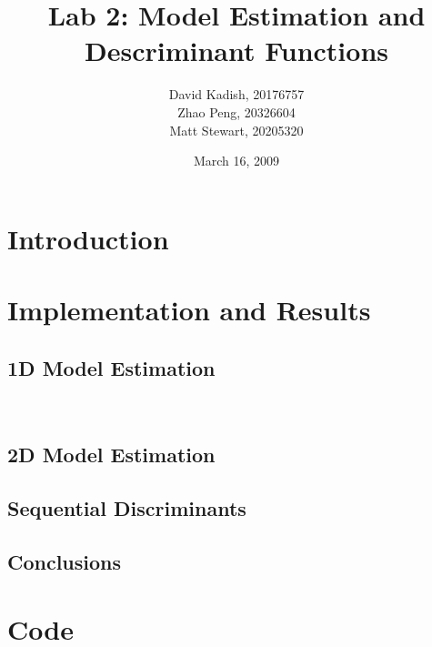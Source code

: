 \documentclass{sydeStyle}
\title{Lab 2: Model Estimation and Descriminant Functions}
\author{
    David Kadish, 20176757\\
    Zhao Peng, 20326604\\
    Matt Stewart, 20205320\\
}
\date{March 16, 2009}
\numberwithin{algorithm}{chapter}
\begin{document}

\maketitle

\setcounter{page}{2} %


\chapter{Introduction}


\chapter{Implementation and Results}
\section{1D Model Estimation}

\
\section{2D Model Estimation}


\section{Sequential Discriminants}


\section{Conclusions}


\appendix
\renewcommand{\thechapter}{\Alph{chapter}}

\chapter{Code}

\end{document}
